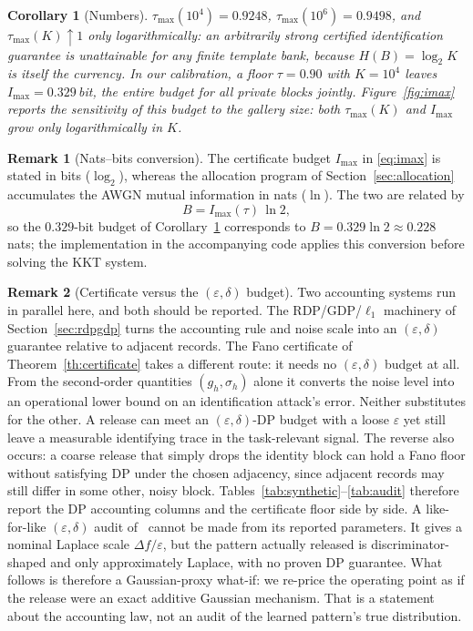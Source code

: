\documentclass{ieeetj}
\theoremstyle{plain}
\newtheorem{corollary}{Corollary}
\theoremstyle{definition}
\newtheorem{remark}{Remark}
\begin{document}
\begin{corollary}[Numbers]
\label{co:numbers}
$\tau_{\max}(10^{4})=0.9248$, $\tau_{\max}(10^{6})=0.9498$, and
$\tau_{\max}(K)\uparrow1$ only logarithmically: an arbitrarily strong
\emph{certified} identification guarantee is unattainable for any finite
template bank, because $H(B)=\log_2K$ is itself the currency. In our
calibration, a floor $\tau=0.90$ with $K=10^{4}$ leaves
$I_{\max}=0.329$\,bit, the entire budget for all private blocks jointly.
Figure~\ref{fig:imax} reports the sensitivity of this budget to the gallery
size: both $\tau_{\max}(K)$ and $I_{\max}$ grow only logarithmically in $K$.
\end{corollary}

\begin{remark}[Nats--bits conversion]
\label{rm:units}
The certificate budget $I_{\max}$ in \eqref{eq:imax} is stated in bits
($\log_2$), whereas the allocation program of Section~\ref{sec:allocation}
accumulates the AWGN mutual information in nats ($\ln$). The two are related
by
\begin{equation}
B = I_{\max}(\tau)\,\ln 2,
\label{eq:natsbits}
\end{equation}
so the $0.329$-bit budget of Corollary~\ref{co:numbers} corresponds to
$B=0.329\ln 2\approx0.228$ nats; the implementation in the accompanying code
applies this conversion before solving the KKT system.
\end{remark}

\begin{remark}[Certificate versus the $(\varepsilon,\delta)$ budget]
\label{rm:twosystems}
Two accounting systems run in parallel here, and both should be reported. The
RDP/GDP/$\ell_1$ machinery of Section~\ref{sec:rdpgdp} turns the accounting rule and noise scale into an
$(\varepsilon,\delta)$ guarantee relative to adjacent records. The Fano certificate of Theorem~\ref{th:certificate} takes a
different route: it needs no $(\varepsilon,\delta)$ budget at all. From the second-order quantities $(g_h,\sigma_h)$
alone it converts the noise level into an operational lower bound on an identification
attack's error. Neither substitutes for the other. A release can meet an $(\varepsilon,\delta)$-DP budget
with a loose $\varepsilon$ yet still leave a measurable identifying trace in the task-relevant
signal. The reverse also occurs: a coarse release that simply drops the identity block
can hold a Fano floor without satisfying DP under the chosen adjacency, since adjacent
records may still differ in some other, noisy block. Tables~\ref{tab:synthetic}--\ref{tab:audit} therefore report
the DP accounting columns and the certificate floor side by side. A like-for-like $(\varepsilon,\delta)$
audit of~\cite{arXiv2510} cannot be made from its reported parameters. It gives a nominal Laplace
scale $\Delta f/\varepsilon$, but the pattern actually released is discriminator-shaped and only
approximately Laplace, with no proven DP guarantee. What follows is therefore a
Gaussian-proxy what-if: we re-price the operating point as if the release were an exact
additive Gaussian mechanism. That is a statement about the accounting law, not an audit
of the learned pattern's true distribution.
\end{remark}
\end{document}
